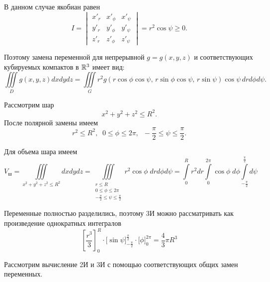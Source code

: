 \documentclass[../../main.tex]{subfiles}
\begin{document}
\begin{iex}
\begin{itemize}
			В данном случае якобиан равен
			\[I = \begin{vmatrix}
				x'_r & x'_\phi & x'_\psi \\
				y'_r & y'_\phi & y'_\psi \\
				z'_r & z'_\phi & z'_\psi
			\end{vmatrix}=r^2\cos{\psi}\geq 0.\]
			
			Поэтому замена переменной для непрерывной $g=g(x, y, z)$ и соответствующих
			кубируемых компактов в $\mathbb{R}^3$ имеет вид:
			\begin{equation}
			\label{lec15:45}
			\iiint\limits_{D} g(x, y, z) dx dy dz=
			\iiint\limits_{G} r^2g(r \cos{\phi} \cos{\psi},\, r \sin{\phi} \cos{\psi},\,
			 r \sin{\psi})\cos{\psi}\, dr d\phi d\psi.
			\end{equation}
		\end{itemize}
	\end{iex}

	\begin{exmp}
		Рассмотрим шар
		\[x^2 + y^2 + z^2 \leq R^2.\]
		После полярной замены имеем \[r^2 \leq R^2, \;\; 0 \leq \phi \leq 2\pi, 
		\;\; -\dfrac{\pi}{2} \leq \psi \leq \dfrac{\pi}{2}.\]
		
		Для объема шара имеем
		\[V_{\text{ш}} = \iiint\limits_{x^2 + y^2 + z^2 \leq R^2} dxdydz = 
		\iiint\limits_{
			\substack{
			r \leq R\\
			0 \leq \phi \leq 2\pi\\
			-\frac{\pi}{2} \leq \psi \leq \frac{\pi}{2}
			}
		}r^2\cos \phi \; dr d\phi d\psi = \int\limits_{0}^{R}r^2dr\int\limits_{0}^
	{2\pi}\cos\phi \; d\phi \int\limits_{-\frac{\pi}{2}}^{\frac{\pi}{2}}d\psi\]
		
		Переменные полностью разделились, поэтому 3И можно рассматривать как 
		произведение
		 однократных интегралов
		\[
		\left[\dfrac{r^3}{3}\right]_{0}^{R} \cdot \Big[\sin \psi 
		\Big]_{-\frac{\pi}{2}}^{\frac{\pi}{2}} \cdot \Big[\phi\Big]_{0}^{2\pi} = 
		\dfrac{4}{3} \pi R^3 
		\]
	\end{exmp}
	
	Рассмотрим вычисление 2И и 3И с помощью соответствующих общих замен 
	переменных. 
	
\end{document}
